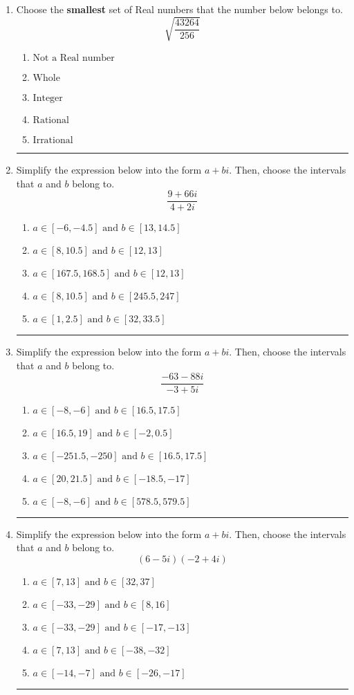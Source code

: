 \documentclass[14pt]{extbook}
\newcommand{\litem}[1]{\item#1\hspace*{-1cm}\rule{\textwidth}{0.4pt}}
\begin{document}
\begin{enumerate}
{\begin{enumerate}[label=\Alph*.]
\end{enumerate} }
\litem{
Choose the \textbf{smallest} set of Real numbers that the number below belongs to.\[ \sqrt{\frac{43264}{256}} \]\begin{enumerate}[label=\Alph*.]
\item \( \text{Not a Real number} \)
\item \( \text{Whole} \)
\item \( \text{Integer} \)
\item \( \text{Rational} \)
\item \( \text{Irrational} \)

\end{enumerate} }
\litem{
Simplify the expression below into the form $a+bi$. Then, choose the intervals that $a$ and $b$ belong to.\[ \frac{9 + 66 i}{4 + 2 i} \]\begin{enumerate}[label=\Alph*.]
\item \( a \in [-6, -4.5] \text{ and } b \in [13, 14.5] \)
\item \( a \in [8, 10.5] \text{ and } b \in [12, 13] \)
\item \( a \in [167.5, 168.5] \text{ and } b \in [12, 13] \)
\item \( a \in [8, 10.5] \text{ and } b \in [245.5, 247] \)
\item \( a \in [1, 2.5] \text{ and } b \in [32, 33.5] \)

\end{enumerate} }
\litem{
Simplify the expression below into the form $a+bi$. Then, choose the intervals that $a$ and $b$ belong to.\[ \frac{-63 - 88 i}{-3 + 5 i} \]\begin{enumerate}[label=\Alph*.]
\item \( a \in [-8, -6] \text{ and } b \in [16.5, 17.5] \)
\item \( a \in [16.5, 19] \text{ and } b \in [-2, 0.5] \)
\item \( a \in [-251.5, -250] \text{ and } b \in [16.5, 17.5] \)
\item \( a \in [20, 21.5] \text{ and } b \in [-18.5, -17] \)
\item \( a \in [-8, -6] \text{ and } b \in [578.5, 579.5] \)

\end{enumerate} }
\litem{
Simplify the expression below into the form $a+bi$. Then, choose the intervals that $a$ and $b$ belong to.\[ (6 - 5 i)(-2 + 4 i) \]\begin{enumerate}[label=\Alph*.]
\item \( a \in [7, 13] \text{ and } b \in [32, 37] \)
\item \( a \in [-33, -29] \text{ and } b \in [8, 16] \)
\item \( a \in [-33, -29] \text{ and } b \in [-17, -13] \)
\item \( a \in [7, 13] \text{ and } b \in [-38, -32] \)
\item \( a \in [-14, -7] \text{ and } b \in [-26, -17] \)


\end{enumerate}}
\end{enumerate}
\end{document}
